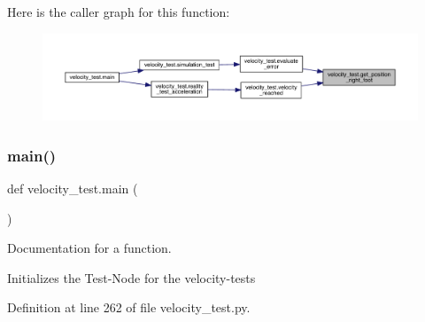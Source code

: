 Here is the caller graph for this function\+:\nopagebreak
\begin{figure}[H]
\begin{center}
\leavevmode
\includegraphics[width=350pt]{namespacevelocity__test_a07bc7929e83ff9cb68e0172f7dbd84f3_icgraph}
\end{center}
\end{figure}
\mbox{\label{namespacevelocity__test_a8f407ca9d9142c949c0b88908466df6c}} 
\subsubsection{\texorpdfstring{main()}{main()}}
{\footnotesize\ttfamily def velocity\+\_\+test.\+main (\begin{DoxyParamCaption}{ }\end{DoxyParamCaption})}



Documentation for a function. 

Initializes the Test-\/\+Node for the velocity-\/tests 

Definition at line 262 of file velocity\+\_\+test.\+py.



